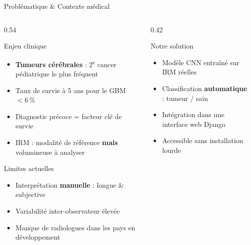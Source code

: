 \documentclass[aspectratio=169, 12pt]{beamer}
\begin{document}
\begin{frame}{Problématique \& Contexte médical}
  \begin{columns}[T]

    \begin{column}{0.54\textwidth}
      \begin{block}{\faHospital\; Enjeu clinique}
        \begin{itemize}
          \item \textbf{Tumeurs cérébrales} : 2\textsuperscript{e} cancer pédiatrique le plus fréquent
          \item Taux de survie à 5 ans pour le GBM $< 6\,\%$
          \item Diagnostic précoce = facteur clé de survie
          \item IRM : modalité de référence \textbf{mais} volumineuse à analyser
        \end{itemize}
      \end{block}

      \vspace{0.4em}
      \begin{alertblock}{\faExclamationTriangle\; Limites actuelles}
        \begin{itemize}
          \item Interprétation \textbf{manuelle} : longue \& subjective
          \item Variabilité inter-observateur élevée
          \item Manque de radiologues dans les pays en développement
        \end{itemize}
      \end{alertblock}
    \end{column}

    \begin{column}{0.42\textwidth}
      \begin{exampleblock}{\faBrain\; Notre solution}
        \begin{itemize}
          \item Modèle CNN entraîné sur IRM réelles
          \item Classification \textbf{automatique} : tumeur / sain
          \item Intégration dans une interface web Django
          \item Accessible sans installation lourde
        \end{itemize}
      \end{exampleblock}


\end{column}
\end{columns}
\end{frame}
\end{document}
